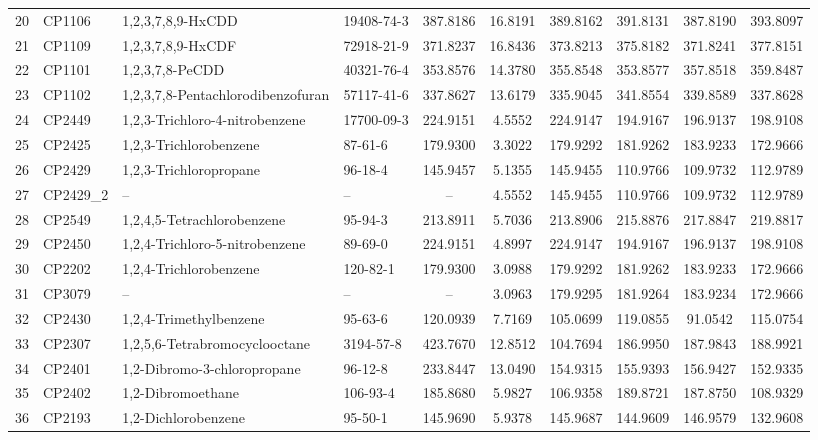 \begin{longtable}{clllcccccc}
20 & CP1106 & 1,2,3,7,8,9-HxCDD & 19408-74-3 & 387.8186 & 16.8191 & 389.8162 & 391.8131 & 387.8190 & 393.8097 \\ 
21 & CP1109 & 1,2,3,7,8,9-HxCDF & 72918-21-9 & 371.8237 & 16.8436 & 373.8213 & 375.8182 & 371.8241 & 377.8151 \\ 
22 & CP1101 & 1,2,3,7,8-PeCDD & 40321-76-4 & 353.8576 & 14.3780 & 355.8548 & 353.8577 & 357.8518 & 359.8487 \\ 
23 & CP1102 & 1,2,3,7,8-Pentachlorodibenzofuran & 57117-41-6 & 337.8627 & 13.6179 & 335.9045 & 341.8554 & 339.8589 & 337.8628 \\ 
24 & CP2449 & 1,2,3-Trichloro-4-nitrobenzene & 17700-09-3 & 224.9151 & 4.5552 & 224.9147 & 194.9167 & 196.9137 & 198.9108 \\ 
25 & CP2425 & 1,2,3-Trichlorobenzene & 87-61-6 & 179.9300 & 3.3022 & 179.9292 & 181.9262 & 183.9233 & 172.9666 \\ 
26 & CP2429 & 1,2,3-Trichloropropane & 96-18-4 & 145.9457 & 5.1355 & 145.9455 & 110.9766 & 109.9732 & 112.9789 \\ 
27 & CP2429\_2 & – & – & – & 4.5552 & 145.9455 & 110.9766 & 109.9732 & 112.9789 \\ 
28 & CP2549 & 1,2,4,5-Tetrachlorobenzene & 95-94-3 & 213.8911 & 5.7036 & 213.8906 & 215.8876 & 217.8847 & 219.8817 \\ 
29 & CP2450 & 1,2,4-Trichloro-5-nitrobenzene & 89-69-0 & 224.9151 & 4.8997 & 224.9147 & 194.9167 & 196.9137 & 198.9108 \\ 
30 & CP2202 & 1,2,4-Trichlorobenzene & 120-82-1 & 179.9300 & 3.0988 & 179.9292 & 181.9262 & 183.9233 & 172.9666 \\ 
31 & CP3079 & – & – & – & 3.0963 & 179.9295 & 181.9264 & 183.9234 & 172.9666 \\ 
32 & CP2430 & 1,2,4-Trimethylbenzene & 95-63-6 & 120.0939 & 7.7169 & 105.0699 & 119.0855 & 91.0542 & 115.0754 \\ 
33 & CP2307 & 1,2,5,6-Tetrabromocyclooctane & 3194-57-8 & 423.7670 & 12.8512 & 104.7694 & 186.9950 & 187.9843 & 188.9921 \\ 
34 & CP2401 & 1,2-Dibromo-3-chloropropane & 96-12-8 & 233.8447 & 13.0490 & 154.9315 & 155.9393 & 156.9427 & 152.9335 \\ 
35 & CP2402 & 1,2-Dibromoethane & 106-93-4 & 185.8680 & 5.9827 & 106.9358 & 189.8721 & 187.8750 & 108.9329 \\ 
36 & CP2193 & 1,2-Dichlorobenzene & 95-50-1 & 145.9690 & 5.9378 & 145.9687 & 144.9609 & 146.9579 & 132.9608 \\ 

\end{longtable}
